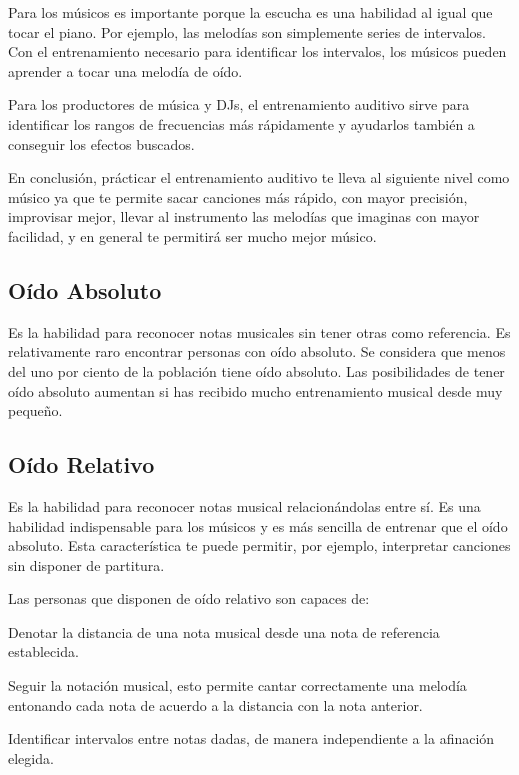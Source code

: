 \documentclass[12pt,twoside,titlepage]{report}
\begin{document}
Para los músicos es importante porque la escucha es una habilidad al igual que tocar el piano. Por ejemplo, las melodías son simplemente series de intervalos. Con el entrenamiento necesario para identificar los intervalos, los músicos pueden aprender a tocar una melodía de oído.

Para los productores de música y DJs, el entrenamiento auditivo sirve para identificar los rangos de frecuencias más rápidamente y ayudarlos también a conseguir los efectos buscados.
\cite{entrenamientoAutitivo1}

En conclusión, prácticar el entrenamiento auditivo te lleva al siguiente nivel como músico ya que te permite sacar canciones más rápido, con mayor precisión, improvisar mejor, llevar al instrumento las melodías que imaginas con mayor facilidad, y en general te permitirá ser mucho mejor músico.
\cite{entrenamientoAutitivo2}

\subsection{Oído Absoluto}

Es la habilidad para reconocer notas musicales sin tener otras como referencia. Es relativamente raro encontrar personas con oído absoluto. Se considera que menos del uno por ciento de la población tiene oído absoluto. Las posibilidades de tener oído absoluto aumentan si has recibido mucho entrenamiento musical desde muy pequeño.
\cite{oidoAbsRel}
\subsection{Oído Relativo}

Es la habilidad para reconocer notas musical relacionándolas entre sí. Es una habilidad indispensable para los músicos y es más sencilla de entrenar que el oído absoluto. Esta característica te puede permitir, por ejemplo, interpretar canciones sin disponer de partitura.

Las personas que disponen de oído relativo son capaces de:
\begin{compactitem}
    \item Denotar la distancia de una nota musical desde una nota de referencia establecida.
    \item Seguir la notación musical, esto permite cantar correctamente una melodía entonando cada nota de acuerdo a la distancia con la nota anterior.
    \item Identificar intervalos entre notas dadas, de manera independiente a la afinación elegida.
\end{compactitem}
\end{document}
